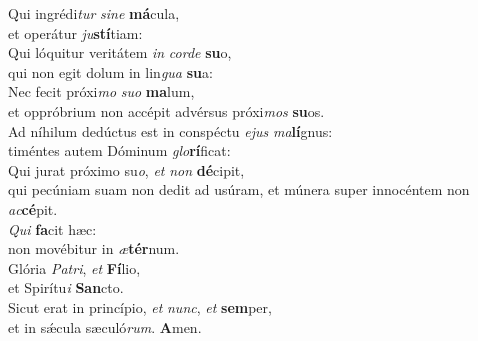 \evenverse Qui ingrédi\textit{tur} \textit{si}\textit{ne} \textbf{má}cula,~\*\\
\evenverse et operátur \textit{ju}\textbf{stí}tiam:\\
\oddverse Qui lóquitur veritátem \textit{in} \textit{cor}\textit{de} \textbf{su}o,~\*\\
\oddverse qui non egit dolum in lin\textit{gua} \textbf{su}a:\\
\evenverse Nec fecit próxi\textit{mo} \textit{su}\textit{o} \textbf{ma}lum,~\*\\
\evenverse et oppróbrium non accépit advérsus próxi\textit{mos} \textbf{su}os.\\
\oddverse Ad níhilum dedúctus est in conspéctu \textit{e}\textit{jus} \textit{ma}\textbf{lí}gnus:~\*\\
\oddverse timéntes autem Dóminum \textit{glo}\textbf{rí}ficat:\\
\evenverse Qui jurat próximo su\textit{o}, \textit{et} \textit{non} \textbf{dé}cipit,~\*\\
\evenverse qui pecúniam suam non dedit ad usúram, et múnera super innocéntem non \textit{ac}\textbf{cé}pit.\\
\oddverse \textit{Qui} \textbf{fa}cit hæc:~\*\\
\oddverse non movébitur in \textit{æ}\textbf{tér}num.\\
\evenverse Glória \textit{Pa}\textit{tri}, \textit{et} \textbf{Fí}lio,~\*\\
\evenverse et Spirítu\textit{i} \textbf{San}cto.\\
\oddverse Sicut erat in princípio, \textit{et} \textit{nunc}, \textit{et} \textbf{sem}per,~\*\\
\oddverse et in sǽcula sæculó\textit{rum}. \textbf{A}men.\\
